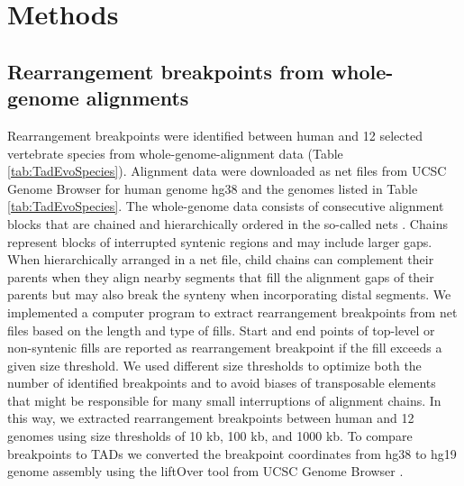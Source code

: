 \documentclass[a4paper,twoside=true,openright,parskip=full,chapterprefix=true,11pt,headings=normal,bibliography=totoc,listof=totoc,titlepage=on,captions=tableabove,draft=false]{scrreprt}
\theoremstyle{definition}
\theoremstyle{definition}
\theoremstyle{definition}
\theoremstyle{remark}
\begin{document}
\hypertarget{methods}{%
\section{Methods}\label{methods}}

\hypertarget{rearrangement-breakpoints-from-whole-genome-alignments}{%
\subsection{Rearrangement breakpoints from whole-genome
alignments}\label{rearrangement-breakpoints-from-whole-genome-alignments}}

Rearrangement breakpoints were identified between human and 12 selected
vertebrate species from whole-genome-alignment data (Table
\ref{tab:TadEvoSpecies}). Alignment data were downloaded as net files
from UCSC Genome Browser for human genome hg38 and the genomes listed in
Table \ref{tab:TadEvoSpecies}. The whole-genome data consists of
consecutive alignment blocks that are chained and hierarchically ordered
in the so-called nets \citep{Kent2003}. Chains represent blocks of
interrupted syntenic regions and may include larger gaps. When
hierarchically arranged in a net file, child chains can complement their
parents when they align nearby segments that fill the alignment gaps of
their parents but may also break the synteny when incorporating distal
segments. We implemented a computer program to extract rearrangement
breakpoints from net files based on the length and type of fills. Start
and end points of top-level or non-syntenic fills are reported as
rearrangement breakpoint if the fill exceeds a given size threshold. We
used different size thresholds to optimize both the number of identified
breakpoints and to avoid biases of transposable elements that might be
responsible for many small interruptions of alignment chains. In this
way, we extracted rearrangement breakpoints between human and 12 genomes
using size thresholds of 10 kb, 100 kb, and 1000 kb. To compare
breakpoints to TADs we converted the breakpoint coordinates from hg38 to
hg19 genome assembly using the liftOver tool from UCSC Genome Browser
\citep{Hinrichs2006}.
\end{document}
